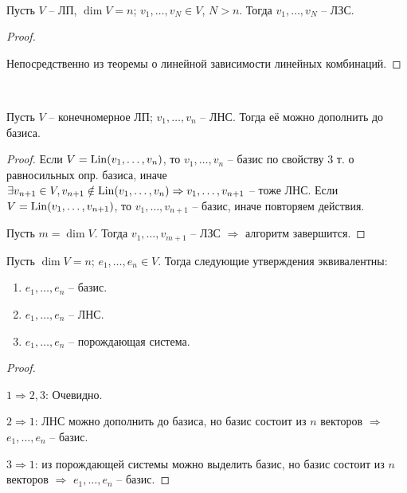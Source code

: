 \
\begin{lemma}
\end{lemma}
Пусть $V$ -- ЛП, $\dim V = n$; $v_1, \dots, v_N \in V$, $N > n$.
Тогда $v_1, \dots, v_N$ -- ЛЗС.
\begin{proof} $ $

    Непосредственно из теоремы о линейной зависимости линейных комбинаций.
\end{proof}

\
\begin{theorem-non}
\end{theorem-non}
Пусть $V$ -- конечномерное ЛП; $v_1, \dots, v_n$ -- ЛНС. Тогда
её можно дополнить до базиса.
\begin{proof}
    Если $V = \operatorname{Lin}(v_1, \dots, v_n)$, то $v_1, \dots, v_n$ -- базис
    по свойству 3 т. о равносильных опр. базиса, иначе
    $\exists v_{n+1} \in V, v_{n+1} \notin \operatorname{Lin}(v_1, \dots, v_n)
    \Rightarrow v_1, \dots, v_{n+1}$ -- тоже ЛНС.
    Если $V = \operatorname{Lin}(v_1, \dots, v_{n+1})$, то $v_1, \dots, v_{n+1}$
    -- базис, иначе повторяем действия.
    
    Пусть $m = \dim V$. Тогда $v_1, \dots, v_{m + 1}$ -- ЛЗС
    $\Rightarrow$ алгоритм завершится.
\end{proof}

\follow 

Пусть $\dim V = n$; $e_1, \dots, e_n \in V$. Тогда
следующие утверждения эквивалентны:
\begin{enumerate}
    \item $e_1, \dots, e_n$ -- базис.
    \item $e_1, \dots, e_n$ -- ЛНС.
    \item $e_1, \dots, e_n$ -- порождающая система.
\end{enumerate}
\begin{proof} $ $

    $1 \Rightarrow 2, 3$: Очевидно.

    $2 \Rightarrow 1$: ЛНС можно дополнить до базиса, 
    но базис состоит из $n$ векторов $\Rightarrow$ 
    $e_1, \dots, e_n$ -- базис.

    $3 \Rightarrow 1$: из порождающей системы можно выделить базис, 
    но базис состоит из $n$ векторов $\Rightarrow$ 
    $e_1, \dots, e_n$ -- базис.
\end{proof}
